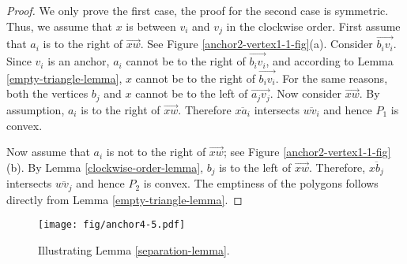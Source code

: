 \documentclass[11pt,a4paper]{article}
\begin{document}
\begin{proof}
We only prove the first case, the proof for the second case is symmetric. Thus, we assume that $x$ is between $v_i$ and $v_j$ in the clockwise order. First assume that $a_i$ is to the right of $\overrightarrow{xw}$. See Figure \ref{anchor2-vertex1-1-fig}(a). Consider $\overrightarrow{b_iv_i}$. Since $v_i$ is an anchor, $a_i$ cannot be to the right of $\overrightarrow{b_iv_i}$, and according to Lemma \ref{empty-triangle-lemma}, $x$ cannot be to the right of $\overrightarrow{b_iv_i}$. For the same reasons, both the vertices $b_j$ and $x$ cannot be to the left of $\overrightarrow{a_jv_j}$. Now consider $\overrightarrow{xw}$. By assumption, $a_i$ is to the right of $\overrightarrow{xw}$. Therefore $\overline{xa_i}$ intersects $\overline{wv_i}$ and hence $P_1$ is convex.

Now assume that $a_i$ is not to the right of $\overrightarrow{xw}$; see Figure \ref{anchor2-vertex1-1-fig}(b). By Lemma \ref{clockwise-order-lemma}, $b_j$ is to the left of $\overrightarrow{xw}$. Therefore, $\overline{xb_j}$ intersects $\overline{wv_j}$ and hence $P_2$ is convex. 
The emptiness of the polygons follows directly from Lemma \ref{empty-triangle-lemma}.
\end{proof}

\begin{figure}[ht]
  \centering
    \texttt{[image: fig/anchor4-5.pdf]}
  \caption{Illustrating Lemma \ref{separation-lemma}.}
\label{anchor4-5-fig}
\end{figure}
\end{document}
